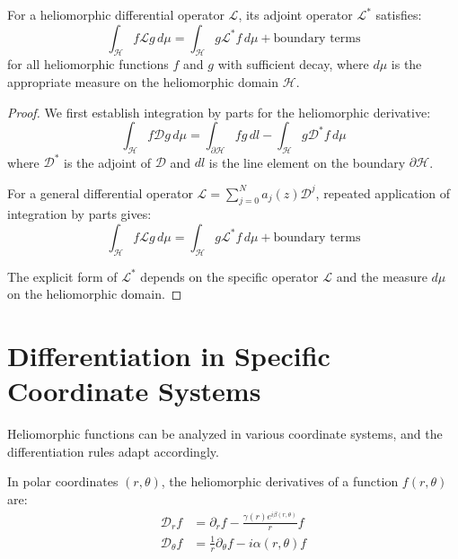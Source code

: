 \begin{theorem}
For a heliomorphic differential operator $\mathcal{L}$, its adjoint operator $\mathcal{L}^*$ satisfies:
\begin{equation}
\int_{\mathcal{H}} f\mathcal{L}g \, d\mu = \int_{\mathcal{H}} g\mathcal{L}^*f \, d\mu + \text{boundary terms}
\end{equation}
for all heliomorphic functions $f$ and $g$ with sufficient decay, where $d\mu$ is the appropriate measure on the heliomorphic domain $\mathcal{H}$.
\end{theorem}

\begin{proof}
We first establish integration by parts for the heliomorphic derivative:
\begin{equation}
\int_{\mathcal{H}} f\mathcal{D}g \, d\mu = \int_{\partial\mathcal{H}} fg \, dl - \int_{\mathcal{H}} g\mathcal{D}^*f \, d\mu
\end{equation}
where $\mathcal{D}^*$ is the adjoint of $\mathcal{D}$ and $dl$ is the line element on the boundary $\partial\mathcal{H}$.

For a general differential operator $\mathcal{L} = \sum_{j=0}^{N} a_j(z) \mathcal{D}^j$, repeated application of integration by parts gives:
\begin{equation}
\int_{\mathcal{H}} f\mathcal{L}g \, d\mu = \int_{\mathcal{H}} g\mathcal{L}^*f \, d\mu + \text{boundary terms}
\end{equation}

The explicit form of $\mathcal{L}^*$ depends on the specific operator $\mathcal{L}$ and the measure $d\mu$ on the heliomorphic domain.
\end{proof}

\section{Differentiation in Specific Coordinate Systems}

Heliomorphic functions can be analyzed in various coordinate systems, and the differentiation rules adapt accordingly.

\begin{theorem}
In polar coordinates $(r,\theta)$, the heliomorphic derivatives of a function $f(r,\theta)$ are:
\begin{align}
\mathcal{D}_rf &= \partial_rf - \frac{\gamma(r)e^{i\beta(r,\theta)}}{r}f\\
\mathcal{D}_\theta f &= \frac{1}{r}\partial_\theta f - i\alpha(r,\theta)f
\end{align}
\end{theorem}

